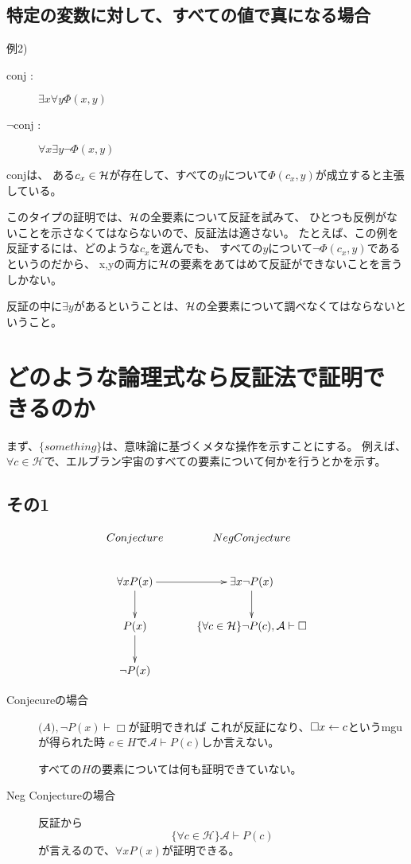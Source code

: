 \documentclass[10pt, oneside]{jarticle}   	%
\begin{document}
\subsection{特定の変数に対して、すべての値で真になる場合}
例2)
\begin{description}
\item[ conj :] $\exists x \forall y \Phi(x,y)$
\item[ $\neg$conj :]  $\forall x \exists y \neg \Phi(x,y)$
\end{description}

conjは、
ある$c_x \in \mathcal{H}$が存在して、すべての$y$について$\Phi(c_x, y)$が成立すると主張している。

このタイプの証明では、$\mathcal{H}$の全要素について反証を試みて、
ひとつも反例がないことを示さなくてはならないので、反証法は適さない。
たとえば、この例を反証するには、どのような$c_x$を選んでも、
すべての$y$について$\neg \Phi(c_x, y)$であるというのだから、
x,yの両方に$\mathcal{H}$の要素をあてはめて反証ができないことを言うしかない。

反証の中に$\exists y$があるということは、$\mathcal{H}$の全要素について調べなくてはならないということ。


\section{どのような論理式なら反証法で証明できるのか}

まず、$\{something\}$は、意味論に基づくメタな操作を示すことにする。
例えば、$\forall c \in \mathcal{H}$で、エルブラン宇宙のすべての要素について何かを行うとかを示す。

\subsection{その1}
$$
\xymatrix{
Conjecture & Neg Conjecture \\
\forall x P(x) \ar[d] \ar[r]& \exists x\neg{P(x)}\ar[d] \\
P(x) \ar[d]& \{\forall c \in \mathcal{H}\} \neg{P(c)}, \mathcal{A} \vdash \Box \\
\neg{P(x)} 
}
$$

\begin{description}
\item[Conjecureの場合] $\mathcal(A), \neg P(x) \vdash \Box$が証明できれば
これが反証になり、$\Box x \leftarrow c$というmguが得られた時
$c \in H$で$\mathcal{A}\vdash P(c)$しか言えない。

すべての$H$の要素については何も証明できていない。

\item[Neg Conjectureの場合]反証から
$$\{\forall c \in \mathcal{H}\} \mathcal{A} \vdash P(c)$$
が言えるので、$\forall x P(x)$が証明できる。

\end{description}
\end{document}
